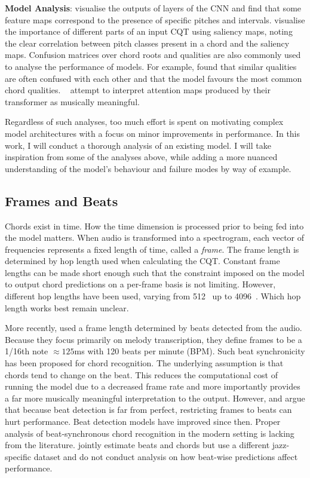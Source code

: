 \textbf{Model Analysis}: \citet{FeatureMaps} visualise the outputs of layers of the CNN and find that some feature maps correspond to the presence of specific pitches and intervals. \citet{SaliencyChroma} visualise the importance of different parts of an input CQT using saliency maps, noting the clear correlation between pitch classes present in a chord and the saliency maps. Confusion matrices over chord roots and qualities are also commonly used to analyse the performance of models. For example, \citet{StructuredTraining} found that similar qualities are often confused with each other and that the model favours the most common chord qualities. ~\citet{BTC} attempt to interpret attention maps produced by their transformer as musically meaningful.

Regardless of such analyses, too much effort is spent on motivating complex model architectures with a focus on minor improvements in performance. In this work, I will conduct a thorough analysis of an existing model. I will take inspiration from some of the analyses above, while adding a more nuanced understanding of the model's behaviour and failure modes by way of example.

\subsection{Frames and Beats}

Chords exist in time. How the time dimension is processed prior to being fed into the model matters. When audio is  transformed into a spectrogram, each vector of frequencies represents a fixed length of time, called a \emph{frame}. The frame length is determined by hop length used when calculating the CQT. Constant frame lengths can be made short enough such that the constraint imposed on the model to output chord predictions on a per-frame basis is not limiting. However, different hop lengths have been used, varying from 512~\cite{ACRLargeVocab1} up to 4096~\citep{StructuredTraining}. Which hop length works best remain unclear.

More recently, \citet{MelodyTranscriptionViaGenerativePreTraining} used a frame length determined by beats detected from the audio. Because they focus primarily on melody transcription, they define frames to be a 1/16th note $\approx 125$ms with 120 beats per minute (BPM). Such beat synchronicity has been proposed for chord recognition. The underlying assumption is that chords tend to change on the beat. This reduces the computational cost of running the model due to a decreased frame rate and more importantly provides a far more musically meaningful interpretation to the output. However, \citet{CommonVariations} and \citet{RelativePerformance} argue that because beat detection is far from perfect, restricting frames to beats can hurt performance. Beat detection models have improved since then. Proper analysis of beat-synchronous chord recognition in the modern setting is lacking from the literature.  \citet{ChorusAlignmentJAAH} jointly estimate beats and chords but use a different jazz-specific dataset and do not conduct analysis on how beat-wise predictions affect performance.

